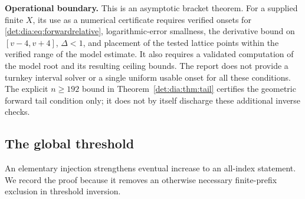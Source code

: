 \documentclass[11pt,letterpaper]{article}
\numberwithin{equation}{section}
\theoremstyle{definition}\newtheorem{definition}[theorem]{Definition}
\theoremstyle{remark}\newtheorem{remark}[theorem]{Remark}
\begin{document}
\noindent\textbf{Operational boundary.}
This is an asymptotic bracket theorem. For a supplied finite $X$, its
use as a numerical certificate requires verified onsets for
\eqref{det:dia:eq:forwardrelative}, logarithmic-error smallness, the derivative
bound on $[v-4,v+4]$, $\Delta<1$, and placement of the tested lattice
points within the verified range of the model estimate. It also requires a validated computation of the model root and
its resulting ceiling bounds. The report does not provide a turnkey
interval solver or a single uniform usable onset for all these
conditions. The explicit $n\geq192$ bound in
Theorem~\ref{det:dia:thm:tail} certifies the geometric forward tail condition
only; it does not by itself discharge these additional inverse checks.

\subsection{The global threshold}
An elementary injection strengthens eventual increase to an all-index
statement. We record the proof because it removes an otherwise necessary
finite-prefix exclusion in threshold inversion.
\end{document}
